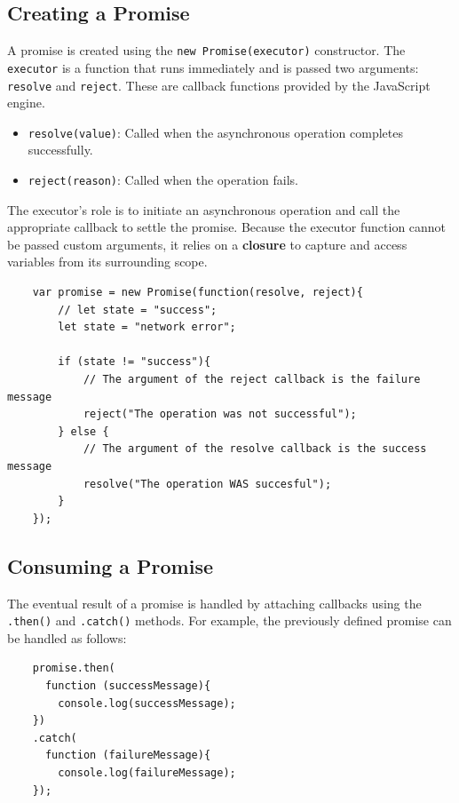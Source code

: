 \documentclass{scrbook}
\begin{document}
\subsection{Creating a Promise}

A promise is created using the \texttt{new Promise(executor)} constructor. The \texttt{executor} is a function that runs immediately and is passed two arguments: \texttt{resolve} and \texttt{reject}. These are callback functions provided by the JavaScript engine.

\begin{itemize}
    \item
    \texttt{resolve(value)}: Called when the asynchronous operation completes successfully.
    
    \item
    \texttt{reject(reason)}: Called when the operation fails.
\end{itemize}

The executor's role is to initiate an asynchronous operation and call the appropriate callback to settle the promise. Because the executor function cannot be passed custom arguments, it relies on a \textbf{closure} to capture and access variables from its surrounding scope.

\begin{lstlisting}
    var promise = new Promise(function(resolve, reject){
        // let state = "success";
        let state = "network error";
    
        if (state != "success"){
            // The argument of the reject callback is the failure message
            reject("The operation was not successful");
        } else {
            // The argument of the resolve callback is the success message
            resolve("The operation WAS succesful");
        }
    });
\end{lstlisting}

\subsection{Consuming a Promise}

The eventual result of a promise is handled by attaching callbacks using the \texttt{.then()} and \texttt{.catch()} methods. For example, the previously defined promise can be handled as follows:
\begin{lstlisting}
    promise.then(
      function (successMessage){
        console.log(successMessage);
    })
    .catch(
      function (failureMessage){
        console.log(failureMessage);
    });
\end{lstlisting}
\end{document}
